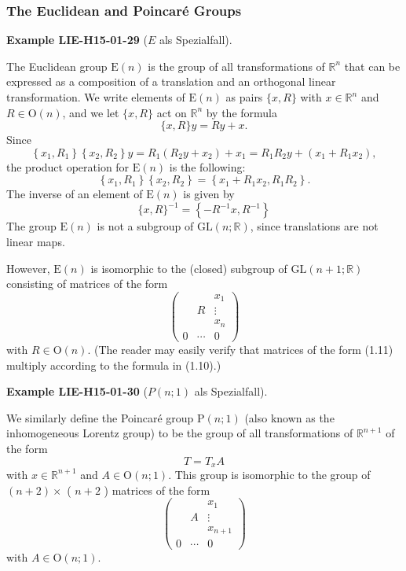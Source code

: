 \documentclass[10pt, letterpaper]{article}
\newcommand{\CustomHeading}[3]{%
  \par\medskip\noindent%
  \textbf{#1 #2} \textnormal{(#3)}.\enskip%
}
\newenvironment{EXA}[2]{\begin{unitbox}\CustomHeading{Example}{#1}{#2}}{\end{unitbox}}
\begin{document}
\subsubsection*{The Euclidean and Poincaré Groups}




\begin{EXA}{LIE-H15-01-29}{$E$ als Spezialfall}
The Euclidean group $\mathrm{E}(n)$ is the group of all transformations of $\mathbb{R}^{n}$ that can be expressed as a composition of a translation and an orthogonal linear transformation. We write elements of $\mathrm{E}(n)$ as pairs $\{x, R\}$ with $x \in \mathbb{R}^{n}$ and $R \in \mathrm{O}(n)$, and we let $\{x, R\}$ act on $\mathbb{R}^{n}$ by the formula
$$
\{x, R\} y=R y+x .
$$
Since
$$
\left\{x_{1}, R_{1}\right\}\left\{x_{2}, R_{2}\right\} y=R_{1}\left(R_{2} y+x_{2}\right)+x_{1}=R_{1} R_{2} y+\left(x_{1}+R_{1} x_{2}\right),
$$
the product operation for $\mathrm{E}(n)$ is the following:
$$
\left\{x_{1}, R_{1}\right\}\left\{x_{2}, R_{2}\right\}=\left\{x_{1}+R_{1} x_{2}, R_{1} R_{2}\right\} .
$$
The inverse of an element of $\mathrm{E}(n)$ is given by
$$
\{x, R\}^{-1}=\left\{-R^{-1} x, R^{-1}\right\}
$$
The group $\mathrm{E}(n)$ is not a subgroup of $\mathrm{GL}(n ; \mathbb{R})$, since translations are not linear maps.

However, $\mathrm{E}(n)$ is isomorphic to the (closed) subgroup of $\mathrm{GL}(n+1 ; \mathbb{R})$ consisting of matrices of the form
$$
\left(\begin{array}{ccc} 
& & x_{1} \\
& R & \vdots \\
& & x_{n} \\
0 & \cdots & 0
\end{array}\right)
$$
with $R \in \mathrm{O}(n)$. (The reader may easily verify that matrices of the form (1.11) multiply according to the formula in (1.10).)
\end{EXA}




\begin{EXA}{LIE-H15-01-30}{$P(n;1)$ als Spezialfall}
We similarly define the Poincaré group $\mathrm{P}(n ; 1)$ (also known as the inhomogeneous Lorentz group) to be the group of all transformations of $\mathbb{R}^{n+1}$ of the form
$$
T=T_{x} A
$$
with $x \in \mathbb{R}^{n+1}$ and $A \in \mathrm{O}(n ; 1)$. This group is isomorphic to the group of $(n+2) \times$ ( $n+2$ ) matrices of the form
$$
\left(\begin{array}{ccc} 
& & x_{1} \\
& A & \vdots \\
& & x_{n+1} \\
0 & \cdots & 0
\end{array}\right)
$$
with $A \in \mathrm{O}(n ; 1)$.
\end{EXA}
\end{document}
